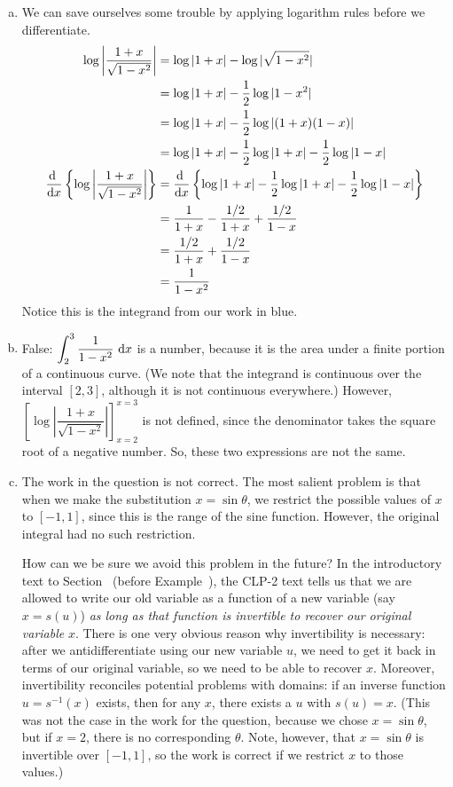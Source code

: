 \begin{solution}
\begin{enumerate}[(a)]
\item We can save ourselves some trouble by applying logarithm rules before we differentiate.
\begin{align*}
\log\left|  \dfrac{1+x}{\sqrt{1-x^2}}\right|&=\log|1+x| - \log|\sqrt{1-x^2}|\\
&=\log|1+x| - \frac{1}{2}\log|1-x^2|\\
&=\log|1+x| - \frac{1}{2}\log|(1+x)(1-x)|\\
&=\log|1+x| - \frac{1}{2}\log|1+x|- \frac{1}{2}\log|1-x|\\
\diff{}{x}\left\{\log\left|  \dfrac{1+x}{\sqrt{1-x^2}}\right|\right\}&=
\diff{}{x}\left\{\log|1+x| - \frac{1}{2}\log|1+x|- \frac{1}{2}\log|1-x|\right\}\\
&=\frac{1}{1+x} -  \frac{1/2}{1+x}+ \frac{1/2}{1-x}\\
&=  \frac{1/2}{1+x}+ \frac{1/2}{1-x}\\
&=\frac{1}{1-x^2}
\end{align*}
Notice this is the integrand from our work in blue.
\item False: $\displaystyle\int_{2}^{3} \frac{1}{1-x^2}~\mathrm{d}x$ is a number, because it is the area under a finite portion of a continuous curve. (We note that the integrand is continuous over the interval $[2,3]$, although it is not continuous everywhere.) However, 
$\left[\log\left|  \dfrac{1+x}{\sqrt{1-x^2}}\right|\right]_{x=2}^{x=3}$ is not defined, since the denominator takes the square root of a negative number. So, these two expressions are not the same.
\item The work in the question is not correct. The most salient problem is that when we make the substitution $x=\sin\theta$, we restrict the possible values of $x$ to $[-1,1]$, since this is the range of the sine function. However, the original integral had no such restriction.

How can we be sure we avoid this problem in the future? In the introductory text to Section~ (before Example~), the 
CLP-2 text tells us that we are allowed to write our old variable as a function of a new variable (say $x=s(u)$) \emph{as long as that function is invertible to recover our original variable} $x$. There is one very obvious reason why invertibility is necessary: after we antidifferentiate using our new variable $u$, we need to get it back in terms of our original variable, so we need to be able to recover $x$. Moreover, invertibility  reconciles  potential problems with domains: if an inverse function $u=s^{-1}(x)$ exists, then for any $x$, there exists a $u$ with $s(u)=x$. (This was not the case in the work for the question, because we chose $x=\sin \theta$, but if $x=2$, there is no corresponding $\theta$. Note, however, that $x=\sin\theta$ is invertible over $[-1,1]$,  so the work is correct if we restrict $x$ to those values.)


\end{enumerate}
\end{solution}
